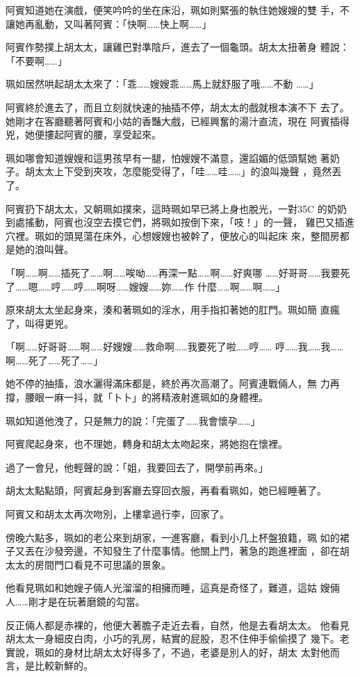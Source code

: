 阿賓知道她在演戲，便笑吟吟的坐在床沿，珮如則緊張的執住她嫂嫂的雙
手，不讓她再亂動，又叫著阿賓：「快啊……快上啊……」

阿賓作勢撲上胡太太，讓雞巴對準陰戶，進去了一個龜頭。胡太太扭著身
體說：「不要啊……」

珮如居然哄起胡太太來了：「乖……嫂嫂乖……馬上就舒服了哦……不動
……」

阿賓終於進去了，而且立刻就快速的抽插不停，胡太太的戲就根本演不下
去了。她剛才在客廳聽著阿賓和小姑的香豔大戲，已經興奮的湯汁直流，現在
阿賓插得兇，她便摟起阿賓的腰，享受起來。

珮如哪會知道嫂嫂和這男孩早有一腿，怕嫂嫂不滿意，還諂媚的低頭幫她
著奶子。胡太太上下受到夾攻，怎麼能受得了，「哇……哇……」的浪叫幾聲
，竟然丟了。

阿賓扔下胡太太，又朝珮如撲來，這時珮如早已將上身也脫光，一對35C
的奶奶到處搖動，阿賓也沒空去摸它們，將珮如按倒下來，「吱！」的一聲，
雞巴又插進穴裡。珮如的頭晃蕩在床外，心想嫂嫂也被幹了，便放心的叫起床
來，整間房都是她的浪叫聲。

「啊……啊……插死了……啊……唉呦……再深一點……啊……好爽哪
……好哥哥……我要死了……嗯……哼……哼……啊呀……嫂嫂……妳……作
什麼……啊……啊……」

原來胡太太坐起身來，湊和著珮如的淫水，用手指扣著她的肛門。珮如簡
直瘋了，叫得更兇。

「啊……好哥哥……啊……好嫂嫂……救命啊……我要死了啦……哼……
哼……我……我……啊……死了……死了……」

她不停的抽搐，浪水灑得滿床都是，終於再次高潮了。阿賓連戰倆人，無
力再撐，腰眼一麻一抖，就「卜卜」的將精液射進珮如的身體裡。

珮如知道他洩了，只是無力的說：「完蛋了……我會懷孕……」

阿賓爬起身來，也不理她，轉身和胡太太吻起來，將她抱在懷裡。

過了一會兒，他輕聲的說：「姐，我要回去了，開學前再來。」

胡太太點點頭，阿賓起身到客廳去穿回衣服，再看看珮如，她已經睡著了。

阿賓又和胡太太再次吻別，上樓拿過行李，回家了。

傍晚六點多，珮如的老公來到胡家，一進客廳，看到小几上杯盤狼籍，珮
如的裙子又丟在沙發旁邊，不知發生了什麼事情。他關上門，著急的跑進裡面
，卻在胡太太的房間門口看見不可思議的景象。

他看見珮如和她嫂子倆人光溜溜的相擁而睡，這真是奇怪了，難道，這姑
嫂倆人……剛才是在玩著磨鏡的勾當。

反正倆人都是赤裸的，他便大著膽子走近去看，自然，他是去看胡太太。
他看見胡太太一身細皮白肉，小巧的乳房，結實的屁股，忍不住伸手偷偷摸了
幾下。老實說，珮如的身材比胡太太好得多了，不過，老婆是別人的好，胡太
太對他而言，是比較新鮮的。

